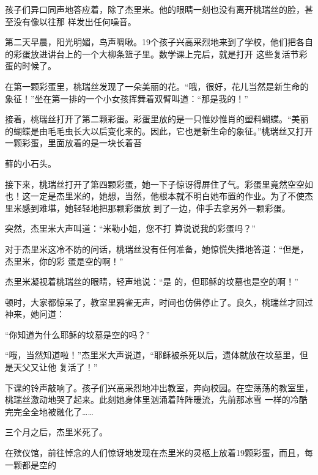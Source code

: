 \documentclass{article}
\begin{document}
孩子们异口同声地答应着，除了杰里米。他的眼睛一刻也没有离开桃瑞丝的脸，甚至没有像以往那
样发出任何噪音。  

第二天早晨，阳光明媚，鸟声啁啾。19个孩子兴高采烈地来到了学校，他们把各自的彩蛋放进讲台上的一个大柳条篮子里。数学课上完后，就是打开
这些复活节彩蛋的时候了。  

在第一颗彩蛋里，桃瑞丝发现了一朵美丽的花。“哦，很好，花儿当然是新生命的象征！”坐在第一排的一个小女孩挥舞着双臂叫道：“那是我的！”
  

接着，桃瑞丝打开了第二颗彩蛋。彩蛋里放的是一只惟妙惟肖的塑料蝴蝶。“美丽的蝴蝶是由毛毛虫长大以后变化来的。因此，它也是新生命的象征。”桃瑞丝又打开一颗彩蛋，里面放着的是一块长着苔
\newpage

藓的小石头。  

接下来，桃瑞丝打开了第四颗彩蛋，她一下子惊讶得屏住了气。彩蛋里竟然空空如也！这一定是杰里米的，她想，当然，他根本就不明白她布置的作业。为了不使杰里米感到难堪，她轻轻地把那颗彩蛋放
到了一边，伸手去拿另外一颗彩蛋。  

突然，杰里米大声叫道：“米勒小姐，您不打
算说说我的彩蛋吗？”  

对于杰里米这冷不防的问话，桃瑞丝没有任何准备，她惊慌失措地答道：“但是，杰里米，你的彩
蛋是空的啊！”  

杰里米凝视着桃瑞丝的眼睛，轻声地说：“是
的，但耶稣的坟墓也是空的啊！”  

顿时，大家都惊呆了，教室里鸦雀无声，时间也仿佛停止了。良久，桃瑞丝才回过神来，她问道：

\newpage
“你知道为什么耶稣的坟墓是空的吗？”  

“哦，当然知道啦！”杰里米大声说道，“耶稣被杀死以后，遗体就放在坟墓里，但是天父又让他
复活了！”  

下课的铃声敲响了。孩子们兴高采烈地冲出教室，奔向校园。在空荡荡的教室里，桃瑞丝激动地哭了起来。此刻她身体里汹涌着阵阵暖流，先前那冰雪
一样的冷酷完完全全地被融化了……  


三个月之后，杰里米死了。  

在殡仪馆，前往悼念的人们惊讶地发现在杰里米的灵柩上放着19颗彩蛋，而且，每一颗都是空的
\end{document}
